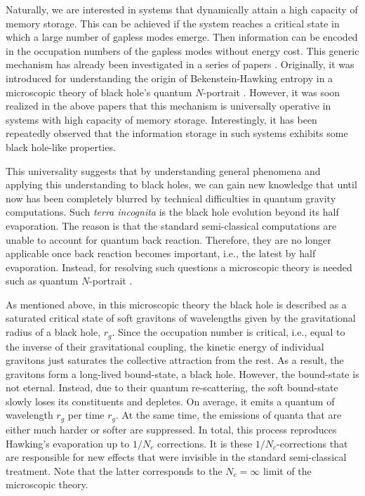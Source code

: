 \documentclass[aps,prd,reprint,superscriptaddress,nofootinbib]{revtex4-2}
\newcommand*{\ie}{i.e., }
\begin{document}
 Naturally, we are interested in systems that dynamically attain
a high capacity of memory storage. This can be achieved if the system reaches a critical state in which a large number of gapless modes emerge. Then information can be encoded in the occupation numbers of the gapless 
modes without energy cost.
 This generic mechanism has already been investigated in a series of papers \cite{1207.4059, 1507.02948, 1711.09079,1801.03918,1712.02233,1805.10292, 1810.02336, 1812.08749}.  Originally, it was introduced 
 for understanding the origin of Bekenstein-Hawking  entropy 
 in a microscopic theory of  black hole's  quantum $N$-portrait
 \cite{1112.3359}. However, it was soon realized in the above 
 papers that this mechanism is universally 
 operative in systems with high capacity of memory storage. 
 Interestingly, it has been repeatedly observed that the information storage
  in such systems exhibits some black hole-like properties.
 
   This universality suggests that by understanding general phenomena and 
applying this understanding to black holes, we can gain new  knowledge that until now has 
 been completely blurred by technical difficulties in quantum gravity  
 computations. Such {\it terra incognita} is the black hole evolution beyond its half evaporation. The reason is that the standard semi-classical computations are unable to account for  quantum back reaction. Therefore, 
they are no longer applicable once back reaction becomes important, \ie the latest by half evaporation.
 Instead, for resolving such questions a microscopic theory is needed
 such as quantum $N$-portrait \cite{1112.3359}.   
 
As mentioned above,  in this microscopic theory the black hole is 
 described as a saturated critical state of soft gravitons of wavelengths 
 given by the gravitational radius of a black hole, $r_g$.  
Since the occupation number is critical, \ie equal to the inverse of their gravitational coupling,
 the kinetic energy of individual gravitons just saturates the
 collective attraction from the rest. As a result, the gravitons form a long-lived bound-state, a black hole.   However, the bound-state 
 is not eternal.  Instead,  due to their quantum re-scattering, 
 the soft bound-state slowly loses its constituents and depletes. 
 On average, it emits a quantum of wavelength $r_g$ per 
 time $r_g$. At the same time, the emissions of quanta that are either much harder or softer 
 are suppressed. In total, this process reproduces Hawking's  evaporation 
up to $1/N_c$ corrections. 
 It is these $1/N_c$-corrections that are responsible for new effects 
 that were invisible in the standard semi-classical treatment. Note that 
 the latter corresponds to the $N_c = \infty$ limit of the microscopic theory.  
 
\end{document}
